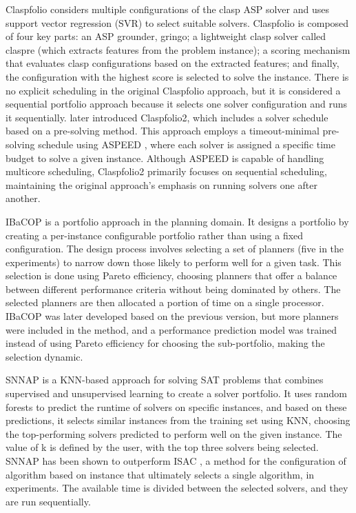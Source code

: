 Claspfolio \cite{10.1007/978-3-642-20895-9_40} considers multiple configurations of the clasp ASP solver and uses support vector regression (SVR) to select suitable solvers. Claspfolio is composed of four key parts: an ASP grounder, gringo; a lightweight clasp solver called claspre (which extracts features from the problem instance); a scoring mechanism that evaluates clasp configurations based on the extracted features; and finally, the configuration with the highest score is selected to solve the instance. There is no explicit scheduling in the original Claspfolio approach, but it is considered a sequential portfolio approach because it selects one solver configuration and runs it sequentially. \cite{hoos2014claspfolio2advancesalgorithm} later introduced Claspfolio2, which includes a solver schedule based on a pre-solving method. This approach employs a timeout-minimal pre-solving schedule using ASPEED \cite{aspeed}, where each solver is assigned a specific time budget to solve a given instance. Although ASPEED is capable of handling multicore scheduling, Claspfolio2 primarily focuses on sequential scheduling, maintaining the original approach's emphasis on running solvers one after another.

IBaCOP \cite{10.5555/3013589.3013607} is a portfolio approach in the planning domain. It designs a portfolio by creating a per-instance configurable portfolio rather than using a fixed configuration. The design process involves selecting a set of planners (five in the experiments) to narrow down those likely to perform well for a given task. This selection is done using Pareto efficiency, choosing planners that offer a balance between different performance criteria without being dominated by others. The selected planners are then allocated a portion of time on a single processor. IBaCOP \cite{cenamor2014ibacop} was later developed based on the previous version, but more planners were included in the method, and a performance prediction model was trained instead of using Pareto efficiency for choosing the sub-portfolio, making the selection dynamic.  

SNNAP \cite{collautti2013snnap} is a KNN-based approach for solving SAT problems that combines supervised and unsupervised learning to create a solver portfolio. It uses random forests to predict the runtime of solvers on specific instances, and based on these predictions, it selects similar instances from the training set using KNN, choosing the top-performing solvers predicted to perform well on the given instance. The value of k is defined by the user, with the top three solvers being selected. SNNAP has been shown to outperform ISAC \cite{kadioglu2010isac}, a method for the configuration of algorithm based on instance that ultimately selects a single algorithm, in experiments. The available time is divided between the selected solvers, and they are run sequentially.

